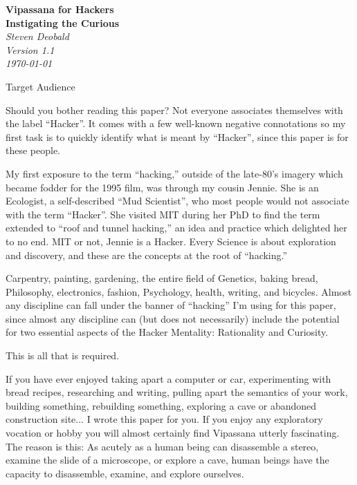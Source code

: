 \documentclass{article}
\begin{document}
\begin{titlepage}
   \begin{center}
     \Huge\textbf{Vipassana for Hackers}\\
     \Large\textbf{Instigating the Curious}\\
     \vspace{5cm}
     \large\textit{Steven Deobald}\\
     \large\textit{Version 1.1}\\
     \large\textit\today
   \end{center}
\end{titlepage}

\begin{center}
  \Huge{Target Audience}
\end{center}

Should you bother reading this paper? Not everyone associates themselves with the label ``Hacker''. It comes with a few well-known negative connotations so my first task is to quickly identify what is meant by ``Hacker'', since this paper is for these people.

My first exposure to the term ``hacking,'' outside of the late-80's imagery which became fodder for the 1995 film, was through my cousin Jennie. She is an Ecologist, a self-described ``Mud Scientist'', who most people would not associate with the term ``Hacker''. She visited MIT during her PhD to find the term extended to ``roof and tunnel hacking,'' an idea and practice which delighted her to no end. MIT or not, Jennie is a Hacker. Every Science is about exploration and discovery, and these are the concepts at the root of ``hacking.''

Carpentry, painting, gardening, the entire field of Genetics, baking bread, Philosophy, electronics, fashion, Psychology, health, writing, and bicycles. Almost any discipline can fall under the banner of ``hacking'' I'm using for this paper, since almost any discipline can (but does not necessarily) include the potential for two essential aspects of the Hacker Mentality: Rationality and Curiosity.

This is all that is required.

If you have ever enjoyed taking apart a computer or car, experimenting with bread recipes, researching and writing, pulling apart the semantics of your work, building something, rebuilding something, exploring a cave or abandoned construction site... I wrote this paper for you. If you enjoy any exploratory vocation or hobby you will almost certainly find Vipassana utterly fascinating. The reason is this: As acutely as a human being can disassemble a stereo, examine the slide of a microscope, or explore a cave, human beings have the capacity to disassemble, examine, and explore ourselves.
\end{document}
